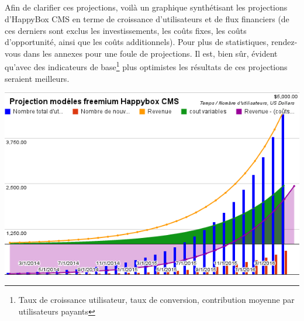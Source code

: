 \documentclass[11pt, a4paper ]{article}
\begin{document}
\begin{spacing}{1.5}
\subparagraph{}
Afin de clarifier ces projections, voilà un graphique synthétisant les projections d'HappyBox CMS en terme de croissance d'utilisateurs et de flux financiers (de ces derniers sont exclus les investissements, les coûts fixes, les coûts d'opportunité, ainsi que les coûts additionnels). Pour plus de statistiques, rendez-vous dans les annexes pour une foule de projections. Il est, bien sûr, évident qu'avec des indicateurs de base\footnote{Taux de croissance utilisateur, taux de conversion, contribution moyenne par utilisateurs payants} plus optimistes les résultats de ces projections seraient meilleurs.

\begin{center}
	\includegraphics[width=\textwidth]{images/media/chartFreemiumHbCMS.png}
\end{center}






\end{spacing}
\end{document}
